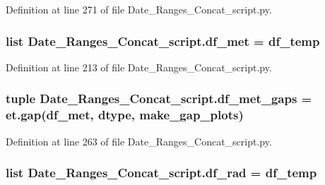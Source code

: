 Definition at line 271 of file Date\+\_\+\+Ranges\+\_\+\+Concat\+\_\+script.\+py.

\hypertarget{namespace_date___ranges___concat__script_a5e14622a073742013d9fbfb848d5bacc}{}
\subsubsection[{df\+\_\+met}]{\setlength{\rightskip}{0pt plus 5cm}list Date\+\_\+\+Ranges\+\_\+\+Concat\+\_\+script.\+df\+\_\+met = {\bf df\+\_\+temp}}\label{namespace_date___ranges___concat__script_a5e14622a073742013d9fbfb848d5bacc}


Definition at line 213 of file Date\+\_\+\+Ranges\+\_\+\+Concat\+\_\+script.\+py.

\hypertarget{namespace_date___ranges___concat__script_a84d25a038de8829ab65c634c27663453}{}
\subsubsection[{df\+\_\+met\+\_\+gaps}]{\setlength{\rightskip}{0pt plus 5cm}tuple Date\+\_\+\+Ranges\+\_\+\+Concat\+\_\+script.\+df\+\_\+met\+\_\+gaps = et.\+gap({\bf df\+\_\+met}, {\bf dtype}, {\bf make\+\_\+gap\+\_\+plots})}\label{namespace_date___ranges___concat__script_a84d25a038de8829ab65c634c27663453}


Definition at line 263 of file Date\+\_\+\+Ranges\+\_\+\+Concat\+\_\+script.\+py.

\hypertarget{namespace_date___ranges___concat__script_a9631d14137c13d0357d9b25cb16274e9}{}
\subsubsection[{df\+\_\+rad}]{\setlength{\rightskip}{0pt plus 5cm}list Date\+\_\+\+Ranges\+\_\+\+Concat\+\_\+script.\+df\+\_\+rad = {\bf df\+\_\+temp}}\label{namespace_date___ranges___concat__script_a9631d14137c13d0357d9b25cb16274e9}


